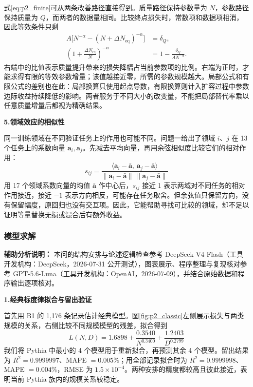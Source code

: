 式\eqref{eq:p2_finite}可从两条改善路径直接得到。质量路径保持参数量为 $N$，参数路径保持质量为 $Q$，而两者的数据量相同。比较终点损失时，常数项和数据项相消，因此等效条件只剩
\begin{equation}
  \begin{aligned}
    A\bigl[N^{-\alpha}-(N+\Delta N_{\mathrm{eq}})^{-\alpha}\bigr]
      &=\delta_Q,\\
    \left(1+\frac{\Delta N_{\mathrm{eq}}}{N}\right)^{-\alpha}
      &=1-\frac{\delta_Q}{AN^{-\alpha}}.
  \end{aligned}
  \label{eq:q2_expand_finite_steps}
\end{equation}
右端中的比值表示质量提升带来的损失降幅占当前参数项的比例。右端为正时，才能求得有限的等效参数增量；该值越接近零，所需的参数规模越大。局部公式和有限公式的差别也在此：局部换算只使用起点导数，有限换算则计入扩容过程中参数边际收益持续降低的影响。两者服务于不同大小的改变量，不能把局部替代率乘以任意质量增量后都视为精确结果。

\textbf{5.领域效应的相似性}\par\nopagebreak[4]
同一训练领域在不同验证任务上的作用也可能不同。问题一给出了领域 $i$、$j$ 在 13 个任务上的系数向量 $\bm a_i,\bm a_j$。先减去平均向量，再用余弦相似度比较它们的相对作用：
\begin{equation}
    s_{ij} = \frac{\langle \bm a_i-\bar{\bm a},\ \bm a_j-\bar{\bm a}\rangle}{\|\bm a_i-\bar{\bm a}\|\,\|\bm a_j-\bar{\bm a}\|}
\end{equation}
用 17 个领域系数向量的均值 $\bar{\bm a}$ 作中心后，$s_{ij}$ 接近 1 表示两域对不同任务的相对作用接近，接近 $-1$ 表示方向相反，可能存在任务取舍。但余弦值只保留方向，没有保留幅度，原回归也没有交互项。因此，它能帮助寻找可比较的领域，却不足以证明等量替换无损或混合后有额外收益。

\subsubsection{模型求解}

\noindent\textbf{辅助分析说明：} 本问的结构安排与论述逻辑检查参考 DeepSeek-V4-Flash（工具开发机构：DeepSeek，2026-07-31 公开测试），图表展示、程序整理与复现核对参考 GPT-5.6-Luna（工具开发机构：OpenAI，2026-07-09），并结合原始数据和程序输出逐项核对。

\textbf{1.经典标度律拟合与留出验证}\par\nopagebreak[4]
首先用 B1 的 1{,}176 条记录估计经典模型。图\ref{fig:p2_classic}左侧展示损失与两类规模的关系，右侧比较不同规模模型的残差，拟合得到
\begin{equation}
    L(N,D) = 1.6898 + \frac{0.3540}{N^{0.3400}} + \frac{1.2403}{D^{0.2799}}
\end{equation}
我们将 Pythia 中最小的 4 个模型用于重新拟合，再预测其余 4 个模型。留出结果为 $R^2=0.9999997$、MAPE $=0.005\%$；用全部记录拟合时为 $R^2=0.9999998$、MAPE $=0.004\%$，RMSE 为 $1.5\times10^{-4}$。两种安排的精度都较高且彼此接近，表明当前 Pythia 族内的规模关系较稳定。
\par

